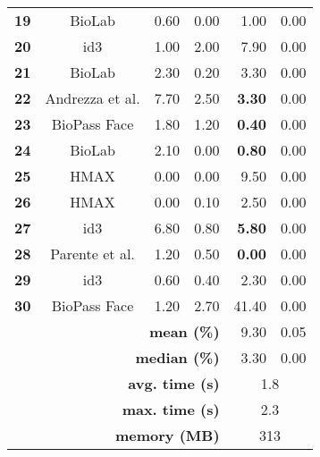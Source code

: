 \begin{table}[t]
\begin{tabular}{ccrrrr}
\textbf{19} & BioLab & 0.60 & {\color[HTML]{9B9B9B} 0.00} & 1.00 & {\color[HTML]{9B9B9B} 0.00} \\
\textbf{20} & id3 & 1.00 & {\color[HTML]{9B9B9B} 2.00} & 7.90 & {\color[HTML]{9B9B9B} 0.00} \\
\textbf{21} & BioLab & 2.30 & {\color[HTML]{9B9B9B} 0.20} & 3.30 & {\color[HTML]{9B9B9B} 0.00} \\
\textbf{22} & Andrezza et al. & 7.70 & {\color[HTML]{9B9B9B} 2.50} & \textbf{3.30} & {\color[HTML]{9B9B9B} 0.00} \\
\textbf{23} & BioPass Face & 1.80 & {\color[HTML]{9B9B9B} 1.20} & \textbf{0.40} & {\color[HTML]{9B9B9B} 0.00} \\
\textbf{24} & BioLab & 2.10 & {\color[HTML]{9B9B9B} 0.00} & \textbf{0.80} & {\color[HTML]{9B9B9B} 0.00} \\
\textbf{25} & HMAX & 0.00 & {\color[HTML]{9B9B9B} 0.00} & 9.50 & {\color[HTML]{9B9B9B} 0.00} \\
\textbf{26} & HMAX & 0.00 & {\color[HTML]{9B9B9B} 0.10} & 2.50 & {\color[HTML]{9B9B9B} 0.00} \\
\textbf{27} & id3 & 6.80 & {\color[HTML]{9B9B9B} 0.80} & \textbf{5.80} & {\color[HTML]{9B9B9B} 0.00} \\
\textbf{28} & Parente et al. & 1.20 & {\color[HTML]{9B9B9B} 0.50} & \textbf{0.00} & {\color[HTML]{9B9B9B} 0.00} \\
\textbf{29} & id3 & 0.60 & {\color[HTML]{9B9B9B} 0.40} & 2.30 & {\color[HTML]{9B9B9B} 0.00} \\
\textbf{30} & BioPass Face & 1.20 & {\color[HTML]{9B9B9B} 2.70} & 41.40 & {\color[HTML]{9B9B9B} 0.00} \\ \hline
\multicolumn{4}{r}{\textbf{mean (\%)}} & 9.30 & 0.05 \\
\multicolumn{4}{r}{\textbf{median (\%)}} & 3.30 & 0.00 \\
\multicolumn{4}{r}{\textbf{avg. time (s)}} & \multicolumn{2}{c}{1.8} \\
\multicolumn{4}{r}{\textbf{max. time (s)}} & \multicolumn{2}{c}{2.3} \\
\multicolumn{4}{r}{\textbf{memory (MB)}} & \multicolumn{2}{c}{313}
\end{tabular}
\end{table}